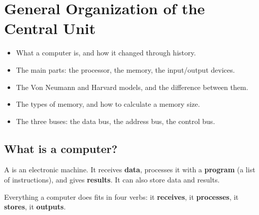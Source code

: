 \chapter{General Organization of the Central Unit}

\begin{khulasa}
\begin{itemize}
    \item What a computer is, and how it changed through history.
    \item The main parts: the processor, the memory, the input/output devices.
    \item The Von Neumann and Harvard models, and the difference between them.
    \item The types of memory, and how to calculate a memory size.
    \item The three buses: the data bus, the address bus, the control bus.
\end{itemize}
\end{khulasa}

\section{What is a computer?}

\begin{tarif}
    A  is an electronic machine. It receives \textbf{data},
    processes it with a \textbf{program} (a list of instructions), and gives \textbf{results}.
    It can also store data and results.
\end{tarif}

Everything a computer does fits in four verbs: it \textbf{receives}, it \textbf{processes},
it \textbf{stores}, it \textbf{outputs}.

\begin{center}
\end{center}

